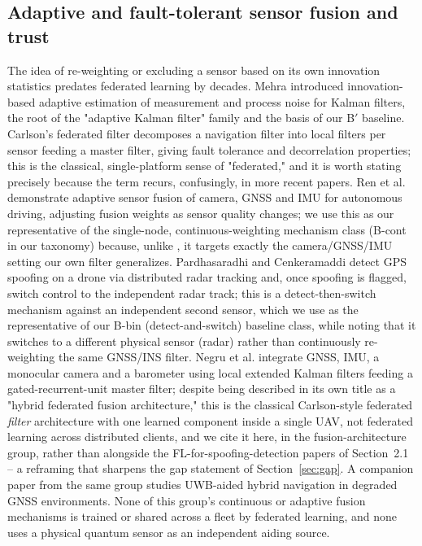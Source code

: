 \documentclass[journal]{IEEEtran}
\begin{document}
\subsection{Adaptive and fault-tolerant sensor fusion and trust}
The idea of re-weighting or excluding a sensor based on its own innovation statistics predates federated
learning by decades. Mehra \cite{mehra1970identification} introduced innovation-based adaptive
estimation of measurement and process noise for Kalman filters, the root of the "adaptive Kalman filter"
family and the basis of our B$'$ baseline. Carlson's federated filter
\cite{carlson1988federated,carlson1990federated} decomposes a navigation filter into local filters per
sensor feeding a master filter, giving fault tolerance and decorrelation properties; this is the
classical, single-platform sense of "federated," and it is worth stating precisely because the term
recurs, confusingly, in more recent papers. Ren et al. \cite{ren2020adaptive} demonstrate adaptive
sensor fusion of camera, GNSS and IMU for autonomous driving, adjusting fusion weights as sensor quality
changes; we use this as our representative of the single-node, continuous-weighting mechanism class
(B-cont in our taxonomy) because, unlike \cite{mehra1970identification}, it targets exactly the
camera/GNSS/IMU setting our own filter generalizes. Pardhasaradhi and Cenkeramaddi
\cite{pardhasaradhi2022gps} detect GPS spoofing on a drone via distributed radar tracking and, once
spoofing is flagged, switch control to the independent radar track; this is a detect-then-switch
mechanism against an independent second sensor, which we use as the representative of our B-bin
(detect-and-switch) baseline class, while noting that it switches to a different physical sensor
(radar) rather than continuously re-weighting the same GNSS/INS filter. Negru et al.
\cite{negru2024resilient} integrate GNSS, IMU, a monocular camera and a barometer using local
extended Kalman filters feeding a gated-recurrent-unit master filter; despite being described in its own
title as a "hybrid federated fusion architecture," this is the classical Carlson-style federated
\emph{filter} architecture with one learned component inside a single UAV, not federated learning across
distributed clients, and we cite it here, in the fusion-architecture group, rather than alongside the
FL-for-spoofing-detection papers of Section~2.1 -- a reframing that sharpens the gap statement of
Section~\ref{sec:gap}. A companion paper from the same group \cite{negru2024uwb} studies UWB-aided
hybrid navigation in degraded GNSS environments. None of this group's continuous or adaptive fusion
mechanisms is trained or shared across a fleet by federated learning, and none uses a physical quantum
sensor as an independent aiding source.
\end{document}
